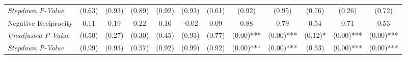 \begin{tabular}{l c c c c c c c c c c c}
\quad \textit{Stepdown P-Value} & (0.63) & (0.93) & (0.89) & (0.92) & (0.93) & (0.61) & (0.92) & (0.95) & (0.76) & (0.26) & (0.72) \\
Negative Reciprocity & 0.11 & 0.19 & 0.22 & 0.16 & -0.02 & 0.09 & 0.88 & 0.79 & 0.54 & 0.71 & 0.53 \\
\quad \textit{Unadjusted P-Value} & (0.50) & (0.27) & (0.30) & (0.45) & (0.93) & (0.77) & (0.00)*** & (0.00)*** & (0.12)* & (0.00)*** & (0.00)*** \\
\quad \textit{Stepdown P-Value} & (0.99) & (0.93) & (0.57) & (0.92) & (0.99) & (0.92) & (0.00)*** & (0.00)*** & (0.53) & (0.00)*** & (0.00)*** \\
\bottomrule
\end{tabular}
